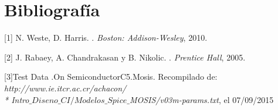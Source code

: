 \documentclass[12pt,a4paper]{article} %
\begin{document}
\section{Bibliografía}
\begin{thebibliography}{3}


[1] N. Weste, D. Harris. 
.
\newblock \emph{Boston: Addison-Wesley}, 2010.

[2] J. Rabaey, A. Chandrakasan y B. Nikolic. 
.
\newblock \emph{Prentice Hall}, 2005.

[3]Test Data .On SemiconductorC5.Mosis. Recompilado de:
\newblock \emph{http://www.ie.itcr.ac.cr/achacon/ \\* Intro$\_Diseno\_CI/Modelos\_Spice\_$MOSIS/v03m-params.txt}, el 07/09/2015

\end{thebibliography}
\end{document}
